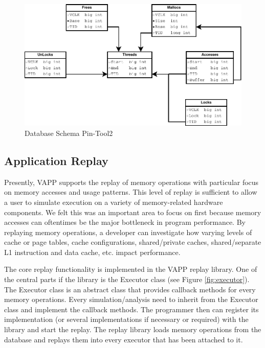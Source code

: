 \begin{figure}
  \includegraphics[width=\columnwidth]{database_schema2}
  \caption{Database Schema Pin-Tool2}
  \label{pic:db_schema2}
\end{figure}


\subsection{Application Replay}
Presently, VAPP supports the replay of memory operations with
particular focus on memory accesses and usage patterns.  This
level of replay is sufficient to allow a user to simulate
execution on a variety of memory-related hardware components.
We felt this was an important area to focus on first because
memory accesses can oftentimes be the major bottleneck in program
performance.  By replaying memory operations, a developer can
investigate how varying levels of cache or page tables, cache 
configurations, shared/private caches, shared/separate L1 instruction
and data cache, etc. impact performance.

The core replay functionality is implemented in the VAPP replay
library. One of the central parts if the library is the Executor class
(see Figure \ref{fig:executor}). The Executor class is an abstract
class that provides callback methods for every memory
operations. Every simulation/analysis need to inherit from the
Executor class and implement the callback methods. The programmer then
can register its implementation (or several implementations if
necessary or required) with the library and start the replay.  The
replay library loads memory operations from the database and replays
them into every executor that has been attached to it.



